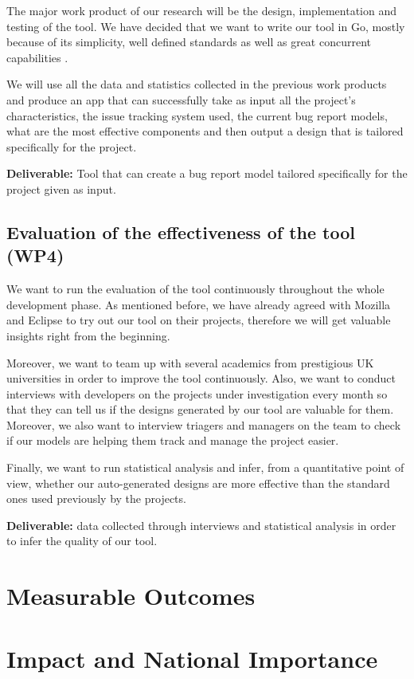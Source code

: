 \documentclass[11pt,english,twocolumn]{article}
\begin{document}
The major work product of our research will be the design, implementation and testing of the 
tool. We have decided that we want to write our tool in Go, mostly because of its 
simplicity, well defined standards as well as great concurrent capabilities \cite{forsby2015evaluation}.

We will use all the data and statistics collected in the previous work products and produce
an app that can successfully take as input all the project's characteristics, the issue tracking
system used, the current bug report models, what are the most effective components and then 
output a design that is tailored specifically for the project.

\textbf{Deliverable:} Tool that can create a bug report model tailored specifically for the 
project given as input.

\subsection*{Evaluation of the effectiveness of the tool (WP4)}

We want to run the evaluation of the tool continuously throughout the whole development phase. 
As mentioned before, we have already agreed with Mozilla and Eclipse to try out our tool on 
their projects, therefore we will get valuable insights right from the beginning.

Moreover, we want to team up with several academics from prestigious UK universities in order 
to improve the tool continuously. Also, we want to conduct interviews with developers on the 
projects under investigation every month so that they can tell us if the designs generated 
by our tool are valuable for them. Moreover, we also want to interview triagers and managers 
on the team to check if our models are helping them track and manage the project easier.

Finally, we want to run statistical analysis and infer, from a quantitative point of view,
whether our auto-generated designs are more effective than the standard ones used previously 
by the projects.

\textbf{Deliverable:} data collected through interviews and statistical analysis in order 
to infer the quality of our tool.

\section{Measurable Outcomes}

\section{Impact and National Importance}

\let\oldbibliography\thebibliography
\renewcommand{\thebibliography}[1]{\oldbibliography{#1}
\setlength{\itemsep}{-3pt}}


{
\scriptsize

}
\end{document}
